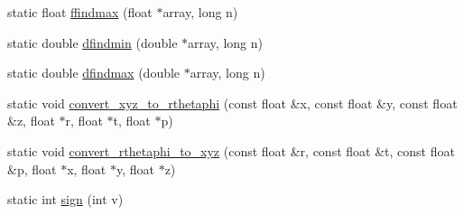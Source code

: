 \begin{DoxyCompactItemize}
static float \hyperlink{classccmc_1_1_math_a5a12d1730df47b78869f2644b6e5a77c}{ffindmax} (float $\ast$array, long n)
\item 
static double \hyperlink{classccmc_1_1_math_a0154b227d4807d14592bd9b25e5ef8a6}{dfindmin} (double $\ast$array, long n)
\item 
static double \hyperlink{classccmc_1_1_math_a1e104becd2c3ff4f0c85d67027c6e91e}{dfindmax} (double $\ast$array, long n)
\item 
static void \hyperlink{classccmc_1_1_math_ac3cd982a1ab801265dcdefdcf01daa51}{convert\-\_\-xyz\-\_\-to\-\_\-rthetaphi} (const float \&x, const float \&y, const float \&z, float $\ast$r, float $\ast$t, float $\ast$p)
\item 
static void \hyperlink{classccmc_1_1_math_a52432f47a5e4cf6e76c06ff98cc971e1}{convert\-\_\-rthetaphi\-\_\-to\-\_\-xyz} (const float \&r, const float \&t, const float \&p, float $\ast$x, float $\ast$y, float $\ast$z)
\item 
static int \hyperlink{classccmc_1_1_math_ab946dbbca55a3cb04182b17b7597cc06}{sign} (int v)
\end{DoxyCompactItemize}


